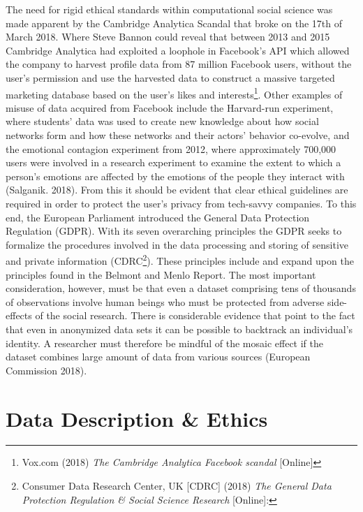 \documentclass[12pt,a4paper]{article}
\begin{document}
The need for rigid ethical standards within computational social science was made apparent by the Cambridge Analytica Scandal that broke on the 17th of March 2018. Where Steve Bannon could reveal that between 2013 and 2015 Cambridge Analytica had exploited a loophole in Facebook’s API which allowed the company to harvest profile data from 87 million Facebook users, without the user’s permission and use the harvested data to construct a massive targeted marketing database based on the user’s likes and interests\footnote{Vox.com (2018) \textit{The Cambridge Analytica Facebook scandal} [Online]}. Other examples of misuse of data acquired from Facebook include the Harvard-run experiment, where students' data was used to create new knowledge about how social networks form and how these networks and their actors' behavior co-evolve, and the emotional contagion experiment from 2012, where approximately 700,000 users were involved in a research experiment to examine the extent to which a person's emotions are affected by the emotions of the people they interact with (Salganik. 2018).\newline
From this it should be evident that clear ethical guidelines are required in order to protect the user's privacy from tech-savvy companies. To this end, the European Parliament introduced the General Data Protection Regulation (GDPR). With its seven overarching principles the GDPR seeks to formalize the procedures involved in the data processing and storing of sensitive and private information (CDRC\footnote{Consumer Data Research Center, UK  [CDRC] (2018) \textit{The General Data Protection Regulation \& Social Science Research} [Online]:}). These principles include and expand upon the principles found in the Belmont and Menlo Report. The most important consideration, however, must be that even a dataset comprising tens of thousands of observations involve human beings who must be protected from adverse side-effects of the social research. There is considerable evidence that point to the fact that even in anonymized data sets it can be possible to backtrack an individual's identity. A researcher must therefore be mindful of the mosaic effect if the dataset combines large amount of data from various sources (European Commission 2018).


\section{Data Description \& Ethics}
\end{document}
